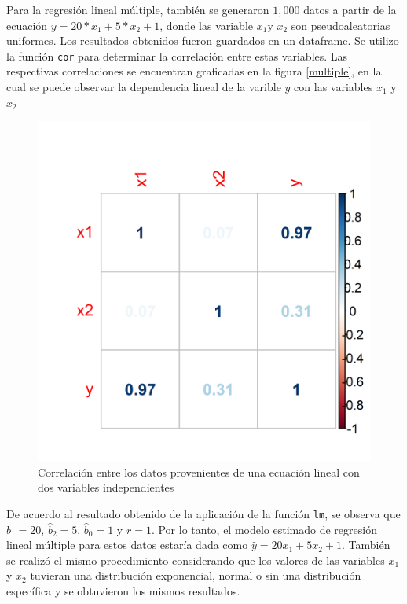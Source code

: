 \documentclass{article}
\begin{document}
Para la regresión lineal múltiple, también se generaron $1,000$ datos a partir de la ecuación $y=20*x_{1}+5*x_{2}+1$, donde las variable $x_{1}$y $x_{2}$ son pseudoaleatorias uniformes. Los resultados obtenidos fueron guardados en un dataframe. Se utilizo la función \texttt{cor} para determinar la correlación entre estas variables. Las respectivas correlaciones se encuentran graficadas en la figura \ref{multiple}, en la cual se puede observar la dependencia lineal de la varible $y$ con las variables $x_{1}$ y $x_{2}$

\begin{figure}[h]
\centering
\includegraphics[scale=0.1]{Figures/linealmultiple.png}
\caption{Correlación entre los datos provenientes de una ecuación lineal con dos variables independientes}
\label{ec1}
\end{figure}


De acuerdo al resultado obtenido de la aplicación de la función \texttt{lm}, se observa que $\hat{b}_{1} = 20$, $\hat{b}_{2} = 5$,  $\hat{b}_{0} = 1$ y $r = 1$. Por lo tanto, el modelo estimado de regresión lineal múltiple para estos datos estaría dada como $\hat{y}=20x_{1}+5x_{2}+1$. También se realizó el mismo procedimiento considerando que los valores de las variables $x_{1}$ y  $x_{2}$ tuvieran una distribución exponencial, normal o sin una distribución específica y se obtuvieron los mismos resultados.
\end{document}
